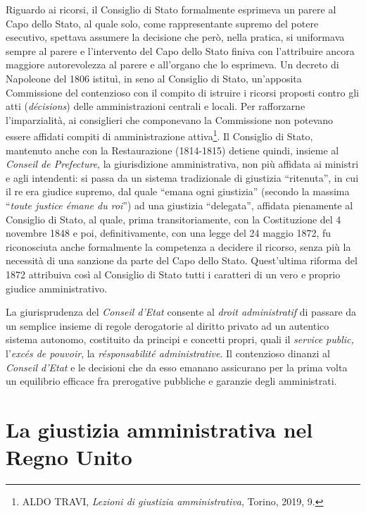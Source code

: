 \documentclass[12pt,it,a4paper,]{report}
\begin{document}
Riguardo ai ricorsi, il Consiglio di Stato formalmente esprimeva un
parere al Capo dello Stato, al quale solo, come rappresentante supremo
del potere esecutivo, spettava assumere la decisione che però, nella
pratica, si uniformava sempre al parere e l'intervento del Capo dello
Stato finiva con l'attribuire ancora maggiore autorevolezza al parere e
all'organo che lo esprimeva. Un decreto di Napoleone del 1806 istituì,
in seno al Consiglio di Stato, un'apposita Commissione del contenzioso
con il compito di istruire i ricorsi proposti contro gli atti
(\emph{décisions}) delle amministrazioni centrali e locali. Per
rafforzarne l'imparzialità, ai consiglieri che componevano la
Commissione non potevano essere affidati compiti di amministrazione
attiva\footnote{ALDO TRAVI, \emph{Lezioni di giustizia amministrativa},
  Torino, 2019, 9.}. Il Consiglio di Stato, mantenuto anche con la
Restaurazione (1814-1815) detiene quindi, insieme al \emph{Conseil de
Prefecture}, la giurisdizione amministrativa, non più affidata ai
ministri e agli intendenti: si passa da un sistema tradizionale di
giustizia ``ritenuta'', in cui il re era giudice supremo, dal quale
``emana ogni giustizia'' (secondo la massima ``\emph{toute justice émane
du roi}'') ad una giustizia ``delegata'', affidata pienamente al
Consiglio di Stato, al quale, prima transitoriamente, con la
Costituzione del 4 novembre 1848 e poi, definitivamente, con una legge
del 24 maggio 1872, fu riconosciuta anche formalmente la competenza a
decidere il ricorso, senza più la necessità di una sanzione da parte del
Capo dello Stato. Quest'ultima riforma del 1872 attribuiva così al
Consiglio di Stato tutti i caratteri di un vero e proprio giudice
amministrativo.

La giurisprudenza del \emph{Conseil d'Etat} consente al \emph{droit
administratif} di passare da un semplice insieme di regole derogatorie
al diritto privato ad un autentico sistema autonomo, costituito da
principi e concetti propri, quali il \emph{service public,}
l'\emph{excés de pouvoir}, la \emph{résponsabilité administrative}. Il
contenzioso dinanzi al \emph{Conseil d'Etat} e le decisioni che da esso
emanano assicurano per la prima volta un equilibrio efficace fra
prerogative pubbliche e garanzie degli amministrati.

\hypertarget{la-giustizia-amministrativa-nel-regno-unito}{%
\chapter{La giustizia amministrativa nel Regno
Unito}\label{la-giustizia-amministrativa-nel-regno-unito}}
\end{document}
